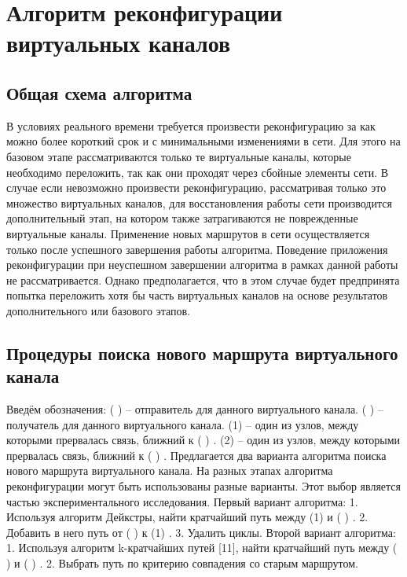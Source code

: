 \documentclass[12pt, a4paper]{article}
\begin{document}
\section{Алгоритм реконфигурации виртуальных каналов}
\subsection{Общая схема алгоритма}
В условиях реального времени требуется произвести реконфигурацию за как можно
более короткий срок и с минимальными изменениями в сети. Для этого на базовом этапе
рассматриваются только те виртуальные каналы, которые необходимо переложить, так
как они проходят через сбойные элементы сети. В случае если невозможно произвести
реконфигурацию, рассматривая только это множество виртуальных каналов, для
восстановления работы сети производится дополнительный этап, на котором также
затрагиваются не поврежденные виртуальные каналы.
Применение новых маршрутов в сети осуществляется только после успешного
завершения работы алгоритма. Поведение приложения реконфигурации при неуспешном
завершении алгоритма в рамках данной работы не рассматривается. Однако
предполагается, что в этом случае будет предпринята попытка переложить хотя бы часть
виртуальных каналов на основе результатов дополнительного или базового этапов.

\subsection{Процедуры поиска нового маршрута виртуального канала}
Введём обозначения:
( ) – отправитель для данного виртуального канала.
 ( ) – получатель для данного виртуального канала.
(1) – один из узлов, между которыми прервалась связь, ближний к ( ) .
(2) – один из узлов, между которыми прервалась связь, ближний к ( ) .
Предлагается два варианта алгоритма поиска нового маршрута виртуального
канала. На разных этапах алгоритма реконфигурации могут быть использованы разные
варианты. Этот выбор является частью экспериментального исследования.
Первый вариант алгоритма:
1. Используя алгоритм Дейкстры, найти кратчайший путь между (1) и ( ) .
2. Добавить в него путь от ( ) к (1) .
3. Удалить циклы.
Второй вариант алгоритма:
1. Используя алгоритм k-кратчайших путей [11], найти кратчайший путь между ( ) и
( ) .
2. Выбрать путь по критерию совпадения со старым маршрутом.
\end{document}
